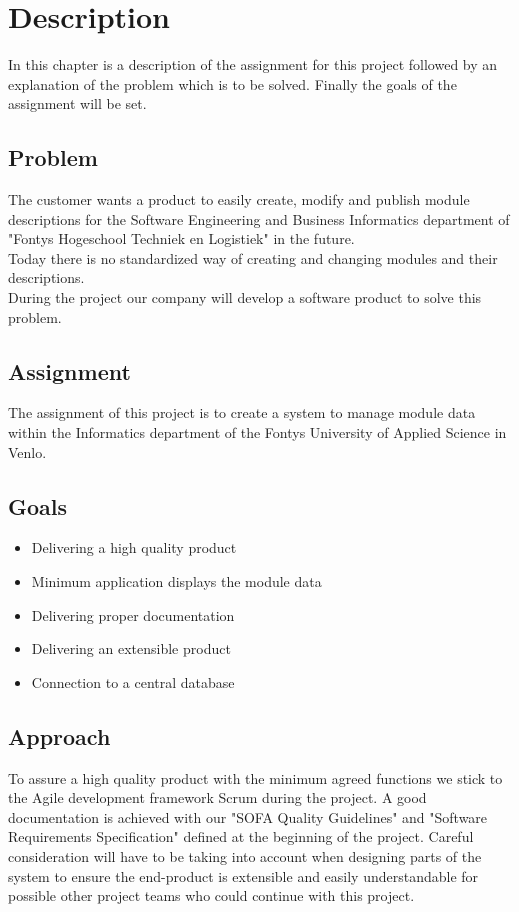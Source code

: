 \chapter{Description}
In this chapter is a description of the assignment for this project followed by an explanation 
of the problem which is to be solved. Finally the goals of the assignment will be set.

\section{Problem}
The customer wants a product to easily create, modify and publish module descriptions
for the Software Engineering and Business Informatics department of "Fontys Hogeschool Techniek en Logistiek" in the future.
\newline \\
Today there is no standardized way of creating and changing modules and their descriptions.
\newline \\
During the project our company will develop a software product to solve this problem.

\section{Assignment}
The assignment of this project is to create a system to manage module data within the Informatics
department of the Fontys University of Applied Science in Venlo. 

\newpage

\section{Goals}
\begin{itemize}
    \item Delivering a high quality product
    \item Minimum application displays the module data 
    \item Delivering proper documentation
    \item Delivering an extensible product
    \item Connection to a central database
\end{itemize}

\section{Approach}
To assure a high quality product with the minimum agreed functions we stick to the Agile development framework Scrum during the project.
A good documentation is achieved with our "SOFA Quality Guidelines" and "Software Requirements Specification" defined at the beginning of the project.
Careful consideration will have to be taking into account when designing parts of the system to ensure the end-product is extensible and easily understandable for possible other project teams who could continue with this project.


